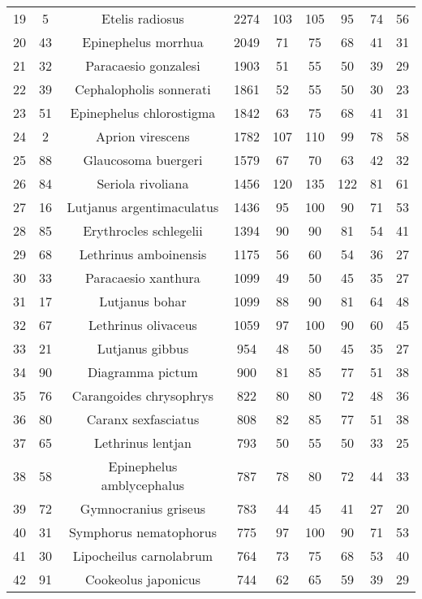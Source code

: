 {\begin{longtable}{ccccccccc}
  19 & 5 & Etelis radiosus & 2274 & 103 & 105 & 95 & 74 & 56 \\ 
  20 & 43 & Epinephelus morrhua & 2049 & 71 & 75 & 68 & 41 & 31 \\ 
  21 & 32 & Paracaesio gonzalesi & 1903 & 51 & 55 & 50 & 39 & 29 \\ 
  22 & 39 & Cephalopholis sonnerati & 1861 & 52 & 55 & 50 & 30 & 23 \\ 
  23 & 51 & Epinephelus chlorostigma & 1842 & 63 & 75 & 68 & 41 & 31 \\ 
  24 & 2 & Aprion virescens & 1782 & 107 & 110 & 99 & 78 & 58 \\ 
  25 & 88 & Glaucosoma buergeri & 1579 & 67 & 70 & 63 & 42 & 32 \\ 
  26 & 84 & Seriola rivoliana & 1456 & 120 & 135 & 122 & 81 & 61 \\ 
  27 & 16 & Lutjanus argentimaculatus & 1436 & 95 & 100 & 90 & 71 & 53 \\ 
  28 & 85 & Erythrocles schlegelii & 1394 & 90 & 90 & 81 & 54 & 41 \\ 
  29 & 68 & Lethrinus amboinensis & 1175 & 56 & 60 & 54 & 36 & 27 \\ 
  30 & 33 & Paracaesio xanthura & 1099 & 49 & 50 & 45 & 35 & 27 \\ 
  31 & 17 & Lutjanus bohar & 1099 & 88 & 90 & 81 & 64 & 48 \\ 
  32 & 67 & Lethrinus olivaceus & 1059 & 97 & 100 & 90 & 60 & 45 \\ 
  33 & 21 & Lutjanus gibbus & 954 & 48 & 50 & 45 & 35 & 27 \\ 
  34 & 90 & Diagramma pictum & 900 & 81 & 85 & 77 & 51 & 38 \\ 
  35 & 76 & Carangoides chrysophrys & 822 & 80 & 80 & 72 & 48 & 36 \\ 
  36 & 80 & Caranx sexfasciatus & 808 & 82 & 85 & 77 & 51 & 38 \\ 
  37 & 65 & Lethrinus lentjan & 793 & 50 & 55 & 50 & 33 & 25 \\ 
  38 & 58 & Epinephelus amblycephalus & 787 & 78 & 80 & 72 & 44 & 33 \\ 
  39 & 72 & Gymnocranius griseus & 783 & 44 & 45 & 41 & 27 & 20 \\ 
  40 & 31 & Symphorus nematophorus & 775 & 97 & 100 & 90 & 71 & 53 \\ 
  41 & 30 & Lipocheilus carnolabrum & 764 & 73 & 75 & 68 & 53 & 40 \\ 
  42 & 91 & Cookeolus japonicus & 744 & 62 & 65 & 59 & 39 & 29 \\ 

\end{longtable}}
